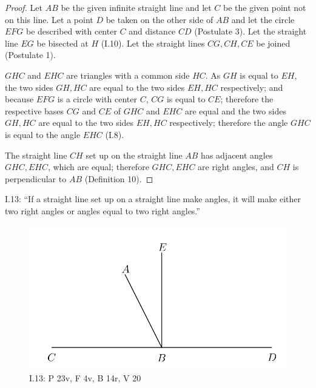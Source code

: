 \documentclass{article}
\begin{document}
\begin{proof}
Let $AB$ be the given infinite straight line and let $C$ be the given point not on this line.
Let a point $D$ be taken on the other side of $AB$ and let the circle $EFG$ be described with center $C$ and
distance $CD$ (Postulate 3).
Let the straight line $EG$ be bisected at $H$ (I.10).
Let the straight lines $CG, CH, CE$ be joined (Postulate 1).

$GHC$ and $EHC$ are triangles with a common side $HC$. 
As $GH$ is equal to $EH$, the two sides $GH,HC$ are equal to the two sides
$EH,HC$ respectively;
and because $EFG$ is a circle with center $C$,
$CG$ is equal to $CE$;
therefore the respective bases $CG$ and $CE$ of $GHC$ and $EHC$ are equal and the two
sides $GH,HC$ are equal to the two sides $EH,HC$ respectively;
therefore the angle $GHC$ is equal to the angle $EHC$ (I.8).

The straight line $CH$ set up on the straight line $AB$ has adjacent angles $GHC,EHC$, which are equal; therefore
$GHC,EHC$ are right angles, and $CH$ is perpendicular to $AB$ (Definition 10).
\end{proof}

I.13: ``If a straight line set up on a straight line make angles, it
will make either two right angles or angles equal to two right
angles.''

\begin{figure}
\begin{center}
\includegraphics[scale=1]{I13.png}
\end{center}
\caption{I.13: P 23v, F 4v, B 14r, V 20}
\label{I13}
\end{figure}
\end{document}
